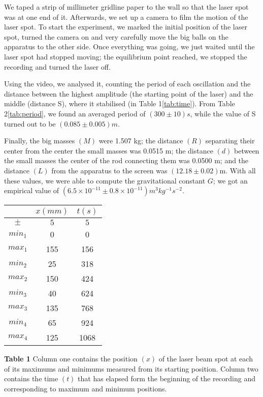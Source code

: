 \documentclass[12pt]{article}
\begin{document}
We taped a strip of millimeter gridline paper to the wall so that the laser spot was at one end of it. Afterwards, we set up a camera to film the motion of the laser spot. To start the experiment, we marked the initial position of the laser spot, turned the camera on and very carefully move the big balls on the apparatus to the other side. Once everything was going, we just waited until the laser spot had stopped moving; the equilibrium point reached, we stopped the recording and turned the laser off.

Using the video, we analysed it, counting the period of each oscillation and the distance between the highest amplitude (the starting point of the laser) and the middle (distance S), where it stabilised (in Table 1\ref{tab:time}). From Table 2\ref{tab:period}, we found an averaged period of $(300 \pm 10) s$, while the value of S turned out to be $(0.085 \pm 0.005) \si{m}$.

Finally, the big masses $(M)$ were 1.507 kg; the distance $(R)$ separating their center from the center the small masses was 0.0515 m; the distance $(d)$ between the small masses the center of the rod connecting them was 0.0500 m; and the distance $(L)$ from the apparatus to the screen was $(12.18 \pm 0.02)$m. With all these values, we were able to compute the gravitational constant $G$; we got an empirical value of $(6.5 \times 10^{-11} \pm 0.8 \times 10^{-11}) \si{m^3kg^{-1}s^{-2}}$.

\newpage
\begin{center}
    \begin{threeparttable}\label{tab:time}
        \begin{tabular}{| c | c | c |}
            \hline
                & $x (mm)$ & $t (s)$\\ \hline
        $\pm$   & $5$ & $5$ \\ \hline 
        $min_1$ & 0   & 0    \\ \hline 
        $max_1$ & 155 & 156  \\ \hline 
        $min_2$ & 25  & 318  \\ \hline 
        $max_2$ & 150 & 424  \\ \hline 
        $min_3$ & 40  & 624  \\ \hline 
        $max_3$ & 135 & 768  \\ \hline 
        $min_4$ & 65  & 924  \\ \hline 
        $max_4$ & 125 & 1068 \\ \hline 
    \end{tabular}

    \begin{tablenotes}
\item \footnotesize \textbf{Table 1} Column one contains the position $(x)$ of the laser beam spot at each of its maximums and minimums measured from its starting position. Column two contains the time $(t)$ that has elapsed form the beginning of the recording and corresponding to maximum and minimum positions. 
    \end{tablenotes}
\end{threeparttable}
\end{center}
\end{document}
